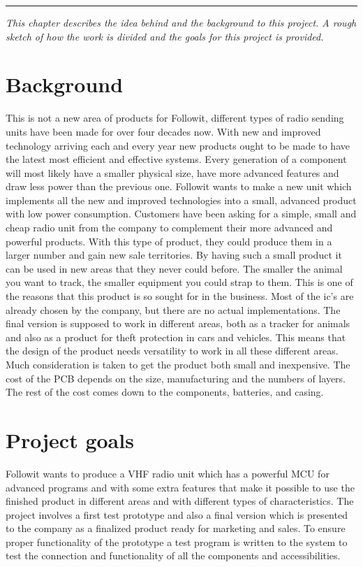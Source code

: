 
\vspace{-10ex}%
\rule{\textwidth}{0.3pt}
\vspace{5ex}

\textit{ 
This chapter describes the idea behind and the background to this project. A rough sketch of how the work is divided and the goals for this project is provided.
}
\vspace{5ex}

\section{Background}
This is not a new area of products for Followit, different types of radio sending units have been made for over four decades now. 
With new and improved technology arriving each and every year new products ought to be made to have the latest most efficient and effective systems. Every generation of a component will most likely have a smaller physical size, have more advanced features and draw less power than the previous one. Followit wants to make a new unit which implements all the new and improved technologies into a small, advanced product with low power consumption. 
Customers have been asking for a simple, small and cheap radio unit from the company to complement their more advanced and powerful products. With this type of product, they could produce them in a larger number and gain new sale territories. By having such a small product it can be used in new areas that they never could before. The smaller the animal you want to track, the smaller equipment you could strap to them. This is one of the reasons that this product is so sought for in the business. 
\newline 
Most of the \gls{ic}'s are already chosen by the company, but there are no actual implementations. The final version is supposed to work in different areas, both as a tracker for animals and also as a product for theft protection in cars and vehicles. This means that the design of the product needs versatility to work in all these different areas.  
Much consideration is taken to get the product both small and inexpensive. The cost of the PCB depends on the size, manufacturing and the numbers of layers. The rest of the cost comes down to the components, batteries, and casing.    \\

\section{Project goals}
Followit wants to produce a VHF radio unit which has a powerful MCU for advanced programs and with some extra features that make it possible to use the finished product in different areas and with different types of characteristics. The project involves a first test prototype and also a final version which is presented to the company as a finalized product ready for marketing and sales. To ensure proper functionality of the prototype a test program is written to the system to test the connection and functionality of all the components and accessibilities. 

